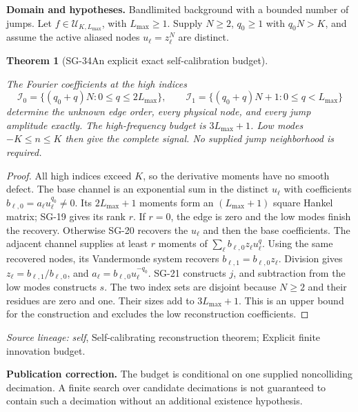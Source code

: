 \documentclass[11pt]{article}
\newtheorem{theorem}{Theorem}[section]
\theoremstyle{definition}\newtheorem{definition}[theorem]{Definition}
\theoremstyle{remark}\newtheorem{remark}[theorem]{Remark}
\begin{document}
\par{\small\textbf{Domain and hypotheses.} Bandlimited background with a bounded number of jumps. Let $f\in\mathcal U_{K,L_{\max}}$, with $L_{\max}\ge1$. Supply $N\ge2$, $q_0\ge1$ with $q_0N>K$, and assume the active aliased nodes $u_\ell=z_\ell^N$ are distinct.}\par
\begin{theorem}[SG-34\quad An explicit exact self-calibration budget]\label{SG-34}

The Fourier coefficients at the high indices
\[
 \mathcal I_0=\{(q_0+q)N:0\le q\le2L_{\max}\},\qquad
 \mathcal I_1=\{(q_0+q)N+1:0\le q<L_{\max}\}
\]
determine the unknown edge order, every physical node, and every jump amplitude
exactly. The high-frequency budget is $3L_{\max}+1$. Low modes
$-K\le n\le K$ then give the complete signal. No supplied jump neighborhood
is required.

\end{theorem}
\begin{proof}

All high indices exceed $K$, so the derivative moments have no smooth defect.
The base channel is an exponential sum in the distinct $u_\ell$ with
coefficients $b_{\ell,0}=a_\ell u_\ell^{q_0}\ne0$.
Its $2L_{\max}+1$ moments form an $(L_{\max}+1)$ square Hankel matrix;
SG-19 gives its rank $r$. If $r=0$, the edge is zero and the low modes finish
the recovery. Otherwise SG-20 recovers the $u_\ell$ and then the base
coefficients. The adjacent channel supplies at least $r$ moments of
$\sum_\ell b_{\ell,0}z_\ell u_\ell^q$. Using the same recovered nodes, its
Vandermonde system recovers $b_{\ell,1}=b_{\ell,0}z_\ell$.
Division gives $z_\ell=b_{\ell,1}/b_{\ell,0}$, and
$a_\ell=b_{\ell,0}u_\ell^{-q_0}$.
SG-21 constructs $j$, and subtraction from the low modes constructs $s$.
The two index sets are disjoint because $N\ge2$ and their residues are zero
and one. Their sizes add to $3L_{\max}+1$. This is an upper bound for the
construction and excludes the low reconstruction coefficients.

\end{proof}

\par{\small\color{Teal}\textit{Source lineage:} \textit{self}, Self-calibrating reconstruction theorem; Explicit finite innovation budget.}\par

\par{\small\textbf{Publication correction.} The budget is conditional on one supplied noncolliding decimation. A finite search over candidate decimations is not guaranteed to contain such a decimation without an additional existence hypothesis.}\par
\end{document}

